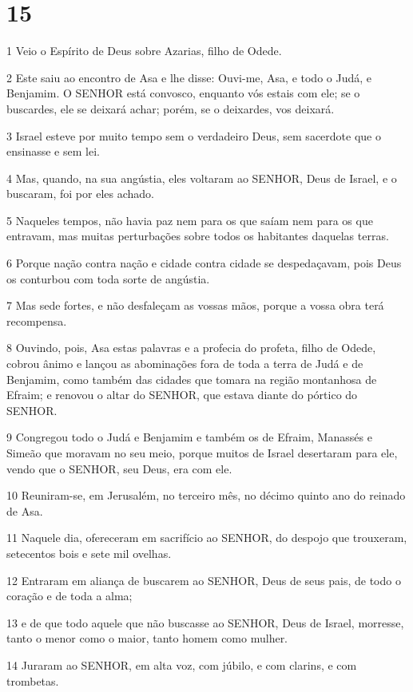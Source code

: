 \chapter{15}

\par 1 Veio o Espírito de Deus sobre Azarias, filho de Odede.
\par 2 Este saiu ao encontro de Asa e lhe disse: Ouvi-me, Asa, e todo o Judá, e Benjamim. O SENHOR está convosco, enquanto vós estais com ele; se o buscardes, ele se deixará achar; porém, se o deixardes, vos deixará.
\par 3 Israel esteve por muito tempo sem o verdadeiro Deus, sem sacerdote que o ensinasse e sem lei.
\par 4 Mas, quando, na sua angústia, eles voltaram ao SENHOR, Deus de Israel, e o buscaram, foi por eles achado.
\par 5 Naqueles tempos, não havia paz nem para os que saíam nem para os que entravam, mas muitas perturbações sobre todos os habitantes daquelas terras.
\par 6 Porque nação contra nação e cidade contra cidade se despedaçavam, pois Deus os conturbou com toda sorte de angústia.
\par 7 Mas sede fortes, e não desfaleçam as vossas mãos, porque a vossa obra terá recompensa.
\par 8 Ouvindo, pois, Asa estas palavras e a profecia do profeta, filho de Odede, cobrou ânimo e lançou as abominações fora de toda a terra de Judá e de Benjamim, como também das cidades que tomara na região montanhosa de Efraim; e renovou o altar do SENHOR, que estava diante do pórtico do SENHOR.
\par 9 Congregou todo o Judá e Benjamim e também os de Efraim, Manassés e Simeão que moravam no seu meio, porque muitos de Israel desertaram para ele, vendo que o SENHOR, seu Deus, era com ele.
\par 10 Reuniram-se, em Jerusalém, no terceiro mês, no décimo quinto ano do reinado de Asa.
\par 11 Naquele dia, ofereceram em sacrifício ao SENHOR, do despojo que trouxeram, setecentos bois e sete mil ovelhas.
\par 12 Entraram em aliança de buscarem ao SENHOR, Deus de seus pais, de todo o coração e de toda a alma;
\par 13 e de que todo aquele que não buscasse ao SENHOR, Deus de Israel, morresse, tanto o menor como o maior, tanto homem como mulher.
\par 14 Juraram ao SENHOR, em alta voz, com júbilo, e com clarins, e com trombetas.
